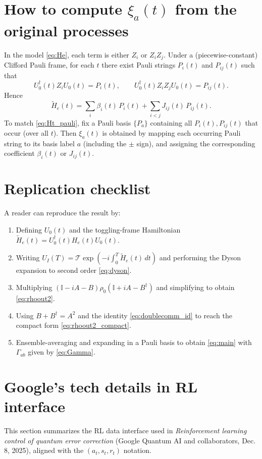 \documentclass[11pt]{article}
\newcommand{\id}{\mathbb{I}}
\begin{document}
\section{How to compute $\xi_a(t)$ from the original processes}
In the model \eqref{eq:He}, each term is either $Z_i$ or $Z_iZ_j$. Under a (piecewise-constant) Clifford Pauli frame, for each $t$ there exist Pauli strings $P_i(t)$ and $P_{ij}(t)$ such that
\begin{equation}
U_0^\dagger(t) Z_i U_0(t)=P_i(t),\qquad
U_0^\dagger(t) Z_iZ_j U_0(t)=P_{ij}(t).
\end{equation}
Hence
\begin{equation}
\widetilde H_e(t)=\sum_i \beta_i(t)\,P_i(t)+\sum_{i<j}J_{ij}(t)\,P_{ij}(t).
\end{equation}
To match \eqref{eq:Ht_pauli}, fix a Pauli basis $\{P_a\}$ containing all $P_i(t),P_{ij}(t)$ that occur (over all $t$). Then $\xi_a(t)$ is obtained by mapping each occurring Pauli string to its basis label $a$ (including the $\pm$ sign), and assigning the corresponding coefficient $\beta_i(t)$ or $J_{ij}(t)$.

\section{Replication checklist}
A reader can reproduce the result by:
\begin{enumerate}
\item Defining $U_0(t)$ and the toggling-frame Hamiltonian $\widetilde H_e(t)=U_0^\dagger(t)H_e(t)U_0(t)$.
\item Writing $U_I(T)=\mathcal{T}\exp(-i\int_0^T \widetilde H_e(t)\,dt)$ and performing the Dyson expansion to second order \eqref{eq:dyson}.
\item Multiplying $(\id-iA-B)\rho_0(\id+iA-B^\dagger)$ and simplifying to obtain \eqref{eq:rhoout2}.
\item Using $B+B^\dagger=A^2$ and the identity \eqref{eq:doublecomm_id} to reach the compact form \eqref{eq:rhoout2_compact}.
\item Ensemble-averaging and expanding in a Pauli basis to obtain \eqref{eq:main} with $\Gamma_{ab}$ given by \eqref{eq:Gamma}.
\end{enumerate}

\section{Google's tech details in RL interface}

This section summarizes the RL data interface used in \emph{Reinforcement learning control of quantum error correction} (Google Quantum AI and collaborators, Dec. 8, 2025), aligned with the $(a_t,s_t,r_t)$ notation.
\end{document}
